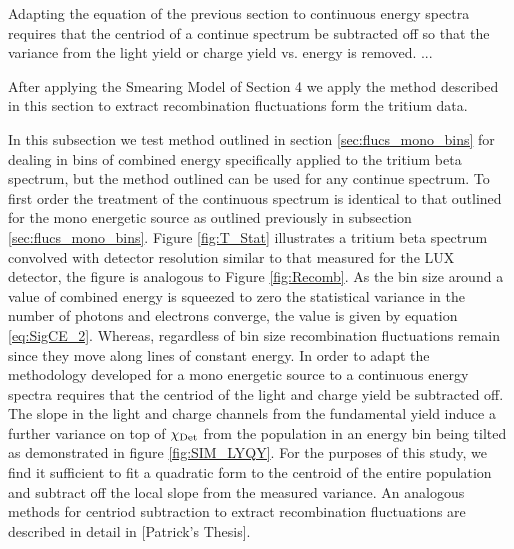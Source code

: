 Adapting the equation of the previous section to continuous energy spectra requires that the centriod of a continue spectrum be subtracted off so that the variance from the light yield or charge yield vs. energy is removed.
...

After applying the Smearing Model of Section 4 we apply the method described in this section to extract recombination fluctuations form the tritium data.

In this subsection we test method outlined in section \ref{sec:flucs_mono_bins} for dealing in bins of combined energy specifically applied to the tritium beta spectrum, but the method outlined can be used for any continue spectrum. To first order the treatment of the continuous spectrum is identical to that outlined for the mono energetic source as outlined previously in subsection \ref{sec:flucs_mono_bins}. Figure \ref{fig:T_Stat} illustrates a tritium beta spectrum convolved with detector resolution similar to that measured for the LUX detector, the figure is analogous to Figure \ref{fig:Recomb}. As the bin size around a value of combined energy is squeezed to zero the statistical variance in the number of photons and electrons converge, the value is given by equation \ref{eq:SigCE_2}. Whereas, regardless of bin size recombination fluctuations remain since they move along lines of constant energy. In order to adapt the methodology developed for a mono energetic source to a continuous energy spectra requires that the centriod of the light and charge yield be subtracted off. The slope in the light and charge channels from the fundamental yield  induce a further variance on top of $\rm \chi_{Det}$ from the population in an energy bin being tilted as demonstrated in figure \ref{fig:SIM_LYQY}. For the purposes of this study, we find it sufficient to fit a quadratic form to the centroid of the entire population and subtract off the local slope from the measured variance. An analogous methods for centriod subtraction to extract recombination fluctuations are described in detail in [Patrick's Thesis].



